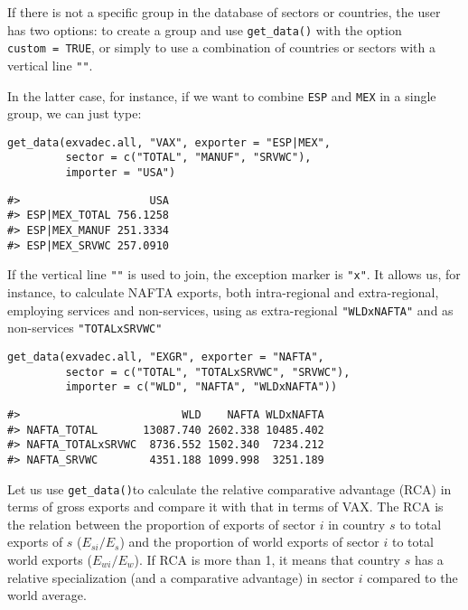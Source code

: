 If there is not a specific group in the database of sectors or countries,
the user has two options: to create a group and use \texttt{get\_data()} with the
option \texttt{custom\ =\ TRUE}, or simply to use a combination of countries or
sectors with a vertical line \texttt{"\textbar{}"}.

In the latter case, for instance, if we want to combine \texttt{ESP} and \texttt{MEX}
in a single group, we can just type:

\begin{verbatim}
get_data(exvadec.all, "VAX", exporter = "ESP|MEX", 
         sector = c("TOTAL", "MANUF", "SRVWC"), 
         importer = "USA")
\end{verbatim}

\begin{verbatim}
#>                    USA
#> ESP|MEX_TOTAL 756.1258
#> ESP|MEX_MANUF 251.3334
#> ESP|MEX_SRVWC 257.0910
\end{verbatim}

If the vertical line \texttt{"\textbar{}"} is used to join, the exception marker is \texttt{"x"}. It
allows us, for instance, to calculate NAFTA exports, both intra-regional and
extra-regional, employing services and non-services, using as extra-regional
\texttt{"WLDxNAFTA"} and as non-services \texttt{"TOTALxSRVWC"}

\begin{verbatim}
get_data(exvadec.all, "EXGR", exporter = "NAFTA", 
         sector = c("TOTAL", "TOTALxSRVWC", "SRVWC"), 
         importer = c("WLD", "NAFTA", "WLDxNAFTA"))
\end{verbatim}

\begin{verbatim}
#>                         WLD    NAFTA WLDxNAFTA
#> NAFTA_TOTAL       13087.740 2602.338 10485.402
#> NAFTA_TOTALxSRVWC  8736.552 1502.340  7234.212
#> NAFTA_SRVWC        4351.188 1099.998  3251.189
\end{verbatim}

Let us use \texttt{get\_data()}to calculate the relative comparative advantage (RCA) in
terms of gross exports and compare it with that in terms of VAX. The RCA is
the relation between the proportion of exports of sector \(i\) in country \(s\)
to total exports of \(s\) (\(E_{si}/E_s\)) and the proportion of world exports of
sector \(i\) to total world exports (\(E_{wi}/E_w\)). If RCA is more than 1, it
means that country \(s\) has a relative specialization (and a comparative
advantage) in sector \(i%
\) compared to the world average.

